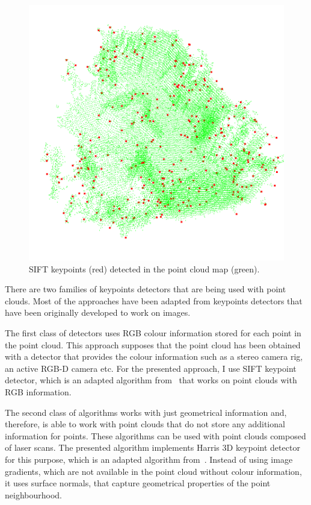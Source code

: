 \begin{figure}
    \centering
    \includegraphics[width=\textwidth]{../img/v1-keypoints.png}
    \caption[Detected keypoints]{\gls{SIFT} keypoints (red) detected in the point cloud map (green).}
    \label{fig:v1-keypoints}
\end{figure}

There are two families of keypoints detectors that are being used with point clouds. Most of the approaches have been adapted from keypoints detectors that have been originally developed to work on images.

The first class of detectors uses \gls{RGB} colour information stored for each point in the point cloud. This approach supposes that the point cloud has been obtained with a detector that provides the colour information such as a stereo camera rig, an active \gls{RGB-D} camera etc. For the presented approach, I use \gls{SIFT} keypoint detector, which is an adapted algorithm from~\citet{lowe2004distinctive} that works on point clouds with \gls{RGB} information.

The second class of algorithms works with just geometrical information and, therefore, is able to work with point clouds that do not store any additional information for points. These algorithms can be used with point clouds composed of laser scans. The presented algorithm implements Harris \gls{3D} keypoint detector for this purpose, which is an adapted algorithm from~\citet{harris1988combined}. Instead of using image gradients, which are not available in the point cloud without colour information, it uses surface normals, that capture geometrical properties of the point neighbourhood.

